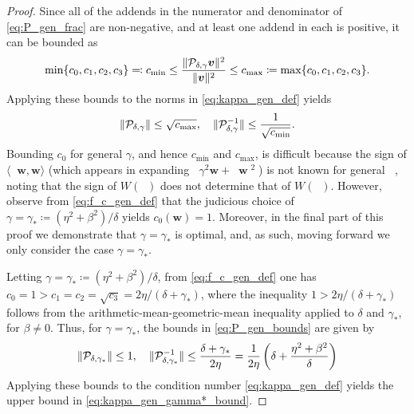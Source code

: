 \documentclass[review]{siamart}
\DeclareMathOperator{\cL}{\widehat{\mathcal{L}}}
\DeclareMathOperator{\cLs}{\widehat{\mathcal{L}}^2}
\DeclareMathOperator{\bVert}{\big\Vert}
\begin{document}
\begin{proof}
Since all of the addends in the numerator and denominator of \eqref{eq:P_gen_frac} are non-negative, and at least one addend in each is positive, it can be bounded as
\begin{align*}
\min \{ c_0, c_1, c_2, c_3 \} \eqqcolon c_{\min}
\leq
\frac{\Vert {\cal P}_{\delta,\gamma} \bm{v} \Vert^2}{\Vert \bm{v} \Vert^2} 
\leq c_{\max} 
\coloneqq \max \{ c_0, c_1, c_2, c_3 \}.
\end{align*}
Applying these bounds to the norms in \eqref{eq:kappa_gen_def} yields
\begin{align} \label{eq:P_gen_bounds}
\Vert {\cal P}_{\delta, \gamma} \Vert \leq \sqrt{c_{\max}}, 
\quad
\Vert {\cal P}_{\delta, \gamma}^{-1} \Vert \leq \frac{1}{\sqrt{c_{\min}}}.
\end{align}
%
Bounding $c_0$ for general $\gamma$, and hence $c_{\min}$ and $c_{\max}$, is
difficult because the sign of $\langle \cLs \bm{w}, \bm{w} \rangle$ (which
appears in expanding $\bVert \gamma^2 \bm{w} + \cLs \bm{w} \bVert^2$) is not
known for general $\cL$, noting that the sign of $W(\cL)$ does not determine
that of $W(\cLs)$. However, observe from \eqref{eq:f_c_gen_def} that the judicious
choice of $\gamma = \gamma_* \coloneqq (\eta^2 + \beta^2)/\delta$ yields $c_0(\bm{w}) = 1$.
Moreover, in the final part of this proof we demonstrate that
$\gamma = \gamma_*$ is optimal, and, as such, moving forward we
only consider the case $\gamma = \gamma_*$.

Letting $\gamma = \gamma_* \coloneqq (\eta^2 + \beta^2)/\delta$, from \eqref{eq:f_c_gen_def} one has $c_0 = 1 > c_1 = c_2
= \sqrt{c_3} = 2 \eta/(\delta + \gamma_*)$, where the inequality $1 > 2 \eta/(\delta + \gamma_*)$ follows from the arithmetic-mean-geometric-mean inequality applied to $\delta$ and $\gamma_*$, for $\beta \neq 0$. Thus, for $\gamma = \gamma_*$, the bounds in \eqref{eq:P_gen_bounds}
are given by
\begin{align}
\label{eq:P_gen_gamma*_bounds}
\Vert {\cal P}_{\delta,\gamma_*} \Vert \leq 1,
\quad
\Vert {\cal P}_{\delta,\gamma_*}^{-1} \Vert 
\leq \frac{\delta + \gamma_*}{2 \eta}
= \frac{1}{2 \eta} \left( \delta + \frac{\eta^2 + \beta^2}{\delta} \right)
\end{align}
Applying these bounds to the condition number \eqref{eq:kappa_gen_def}
yields the upper bound in \eqref{eq:kappa_gen_gamma*_bound}.


\end{proof}
\end{document}
